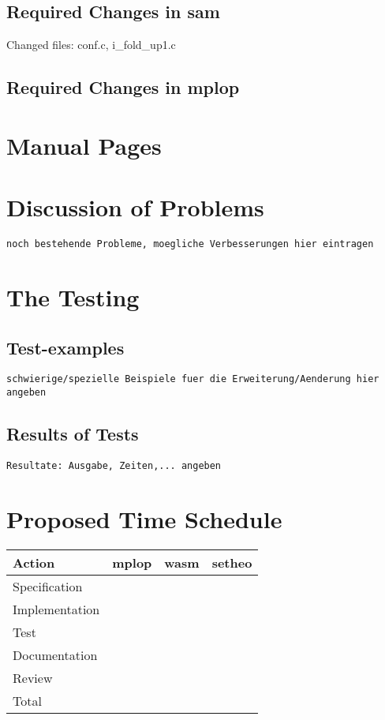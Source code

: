 \subsection{Required Changes in sam}

Changed files: conf.c, i\_fold\_up1.c


\subsection{Required Changes in mplop}


\section{Manual Pages}

\section{Discussion of Problems}

{\tt noch bestehende Probleme, moegliche Verbesserungen hier eintragen}

\section{The Testing}
\subsection{Test-examples}
{\tt schwierige/spezielle Beispiele fuer die Erweiterung/Aenderung hier angeben}

\subsection{Results of Tests}
{\tt Resultate: Ausgabe, Zeiten,... angeben}

\section{Proposed Time Schedule}

\begin{center}
\begin{tabular}{|l|r|r|r|}
\hline\hline
Action & mplop & wasm & setheo \\
\hline
Specification & & & \\
Implementation & & & \\
Test & & & \\
Documentation & & & \\
Review & & & \\
\hline
Total & & & \\
\hline\hline
\end{tabular}
\end{center}


